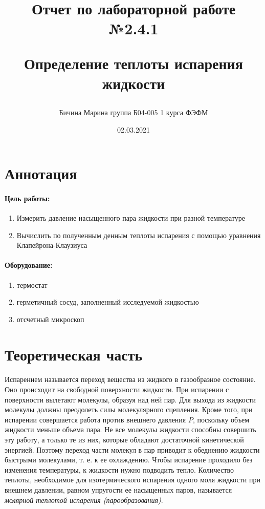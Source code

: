 \documentclass[a4paper,12pt]{article}
\author{Бичина Марина 
группа Б04-005 1 курса ФЭФМ}
\title{Отчет по лабораторной работе №2.4.1


Определение теплоты испарения жидкости}
\date{02.03.2021}
\begin{document}

\maketitle
\newpage

\section{Аннотация}

\paragraph{Цель работы:} 
\begin{enumerate}
\itemsep0em
\item Измерить давление насыщенного пара жидкости при разной температуре 
\item Вычислить по полученным денным теплоты испарения с помощью уравнения Клапейрона-Клаузиуса
\end{enumerate}
\paragraph{Оборудование:}
\begin{enumerate}
\itemsep0em
\item термостат
\item герметичный сосуд, заполненный исследуемой жидкостью
\item отсчетный микроскоп
\end{enumerate}
\section{Теоретическая часть}

\paragraph{} Испарением называется переход вещества из жидкого в газообразное состояние. Оно происходит на свободной поверхности жидкости. При испарении с поверхности вылетают молекулы, образуя над ней пар. Для выхода из жидкости молекулы должны преодолеть силы молекулярного сцепления. Кроме того, при испарении совершается работа против внешнего давления $P$, поскольку объем жидкости меньше объема пара. Не все молекулы жидкости способны совершить эту работу, а только те из них, которые обладают достаточной кинетической энергией. Поэтому переход части молекул в пар приводит к обеднению жидкости быстрыми молекулами, т. е. к ее охлаждению. Чтобы испарение проходило без изменения температуры, к жидкости нужно подводить тепло. Количество теплоты, необходимое для изотермического испарения одного моля жидкости при внешнем давлении, равном упругости ее насыщенных паров, называется \textit{молярной теплотой испарения (парообразования)}.
\end{document}
